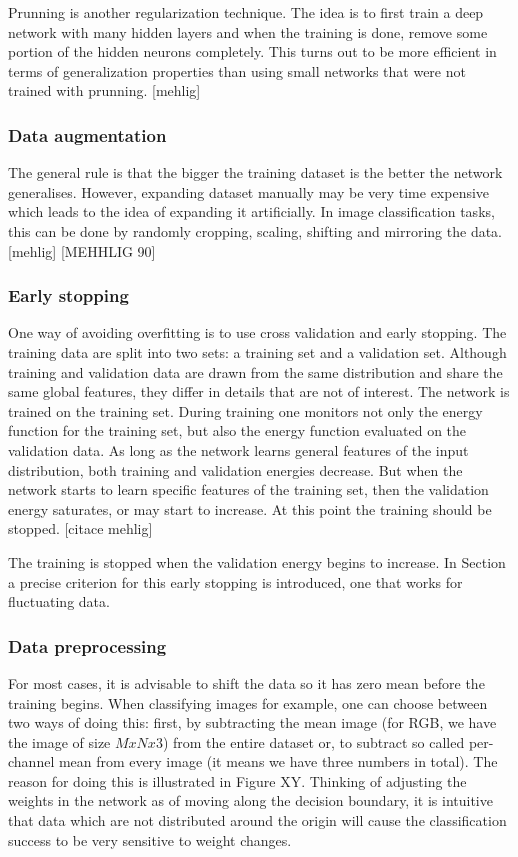 Prunning is another regularization technique. The idea is to first train a deep network with many hidden layers and when the training is done, remove some portion of the hidden neurons completely. This turns out to be more efficient in terms of generalization properties than using small networks that were not trained with prunning. [mehlig]

\subsubsection{Data augmentation}

The general rule is that the bigger the training dataset is the better the network generalises. However, expanding dataset manually may be very time expensive which leads to the idea of expanding it artificially. In image classification tasks, this can be done by randomly cropping, scaling, shifting and mirroring the data. [mehlig]
[MEHHLIG 90]

\subsubsection{Early stopping}
One way of avoiding overfitting is to use cross validation and early stopping. The training data are split into two sets: a training set and a validation set. Although training and validation data are drawn from the same distribution and share the same global features, they differ in details that are not of interest. The network is trained on the training set. During training one monitors not only the energy function for the training set, but also the energy function evaluated on the validation data. As long as the network learns general features of the input distribution, both training and validation energies decrease. But when the network starts to learn specific features of the training set, then the validation energy saturates, or may start to increase. At this point the training should be stopped. [citace mehlig]

The training is stopped when the validation energy begins to
increase. In Section a precise criterion for this early stopping is introduced, one that works for fluctuating data.

\subsubsection{Data preprocessing}

For most cases, it is advisable to shift the data so it has zero mean before the training begins. When classifying images for example, one can choose between two ways of doing this: first, by subtracting the mean image (for RGB, we have the image of size $ MxNx3 $) from the entire dataset or, to subtract so called per-channel mean from every image (it means we have three numbers in total). The reason for doing this is illustrated in Figure XY. Thinking of adjusting the weights in the network as of moving along the decision boundary, it is intuitive that data which are not distributed around the origin will cause the classification success to be very sensitive to weight changes.

